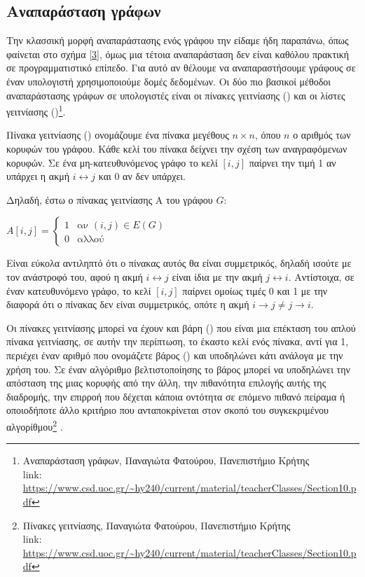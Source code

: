 \subsection{Αναπαράσταση γράφων}
Την κλασσική μορφή αναπαράστασης ενός γράφου την είδαμε ήδη παραπάνω, όπως φαίνεται στο σχήμα \ref{3}, όμως μια τέτοια αναπαράσταση δεν είναι καθόλου πρακτική σε προγραμματιστικό επίπεδο. Για αυτό αν θέλουμε να αναπαραστήσουμε γράφους σε έναν υπολογιστή χρησιμοποιούμε δομές δεδομένων. Οι δύο πιο βασικοί μέθοδοι αναπαράστασης γράφων σε υπολογιστές είναι οι πίνακες γειτνίασης () και οι λίστες γειτνίασης ()\footnote{Αναπαράσταση γράφων, Παναγιώτα Φατούρου, Πανεπιστήμιο Κρήτης\\link: \url{https://www.csd.uoc.gr/~hy240/current/material/teacherClasses/Section10.pdf}}.

Πίνακα γειτνίασης () ονομάζουμε ένα πίνακα μεγέθους $n\times n$, όπου $n$ ο αριθμός των κορυφών του γράφου. Κάθε κελί του πίνακα δείχνει την σχέση των αναγραφόμενων κορυφών. Σε ένα μη-κατευθυνόμενος γράφο το κελί $[i, j]$ παίρνει την τιμή 1 αν υπάρχει η ακμή $i \longleftrightarrow j$ και 0 αν δεν υπάρχει. 

Δηλαδή, έστω ο πίνακας γειτνίασης A του γράφου $G$:
\begin{center}
    $A[i, j] = 
    \begin{cases}
      1 & \text{αν $(i,j) \in E(G)$}\\
      0 & \text{αλλού}
    \end{cases}$
\end{center}
Είναι εύκολα αντιληπτό ότι ο πίνακας αυτός θα είναι συμμετρικός, δηλαδή ισούτε με τον ανάστροφό του, αφού η ακμή $i \longleftrightarrow j$ είναι ίδια με την ακμή $j \longleftrightarrow i$. Αντίστοιχα, σε έναν κατευθυνόμενο γράφο, το κελί $[i, j]$ παίρνει ομοίως τιμές 0 και 1 με την διαφορά ότι ο πίνακας δεν είναι συμμετρικός, οπότε η ακμή $i \rightarrow j \neq j \rightarrow i$. 

Οι πίνακες γειτνίασης μπορεί να έχουν και βάρη () που είναι μια επέκταση του απλού πίνακα γειτνίασης, σε αυτήν την περίπτωση, το έκαστο κελί ενός πίνακα, αντί για 1, περιέχει έναν αριθμό που ονομάζετε βάρος () και υποδηλώνει κάτι ανάλογα με την χρήση του. Σε έναν αλγόριθμο βελτιστοποίησης το βάρος μπορεί να υποδηλώνει την απόσταση της μιας κορυφής από την άλλη, την πιθανότητα επιλογής αυτής της διαδρομής, την επιρροή που δέχεται κάποια οντότητα σε επόμενο πιθανό πείραμα ή οποιοδήποτε άλλο κριτήριο που ανταποκρίνεται στον σκοπό του συγκεκριμένου αλγορίθμου\footnote{Πίνακες γειτνίασης, Παναγιώτα Φατούρου, Πανεπιστήμιο Κρήτης \\link: \url{https://www.csd.uoc.gr/~hy240/current/material/teacherClasses/Section10.pdf}} \cite{gkertsis2023thewria}.


